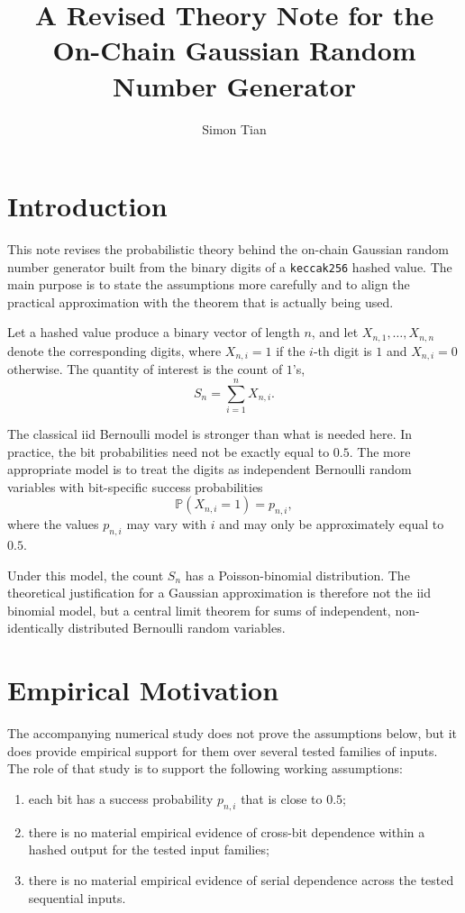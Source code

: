 \documentclass[11pt]{article}
\title{A Revised Theory Note for the On-Chain Gaussian Random Number Generator}
\author{Simon Tian}
\date{}
\begin{document}
\maketitle

\section{Introduction}

This note revises the probabilistic theory behind the on-chain Gaussian random
number generator built from the binary digits of a \texttt{keccak256} hashed
value. The main purpose is to state the assumptions more carefully and to align
the practical approximation with the theorem that is actually being used.

Let a hashed value produce a binary vector of length $n$, and let
$X_{n,1}, \dots, X_{n,n}$ denote the corresponding digits, where
$X_{n,i} = 1$ if the $i$-th digit is $1$ and $X_{n,i} = 0$ otherwise. The
quantity of interest is the count of $1$'s,
\[
S_n = \sum_{i=1}^n X_{n,i}.
\]

The classical iid Bernoulli model is stronger than what is needed here. In
practice, the bit probabilities need not be exactly equal to $0.5$. The more
appropriate model is to treat the digits as independent Bernoulli random
variables with bit-specific success probabilities
\[
\mathbb{P}(X_{n,i} = 1) = p_{n,i},
\]
where the values $p_{n,i}$ may vary with $i$ and may only be approximately
equal to $0.5$.

Under this model, the count $S_n$ has a Poisson-binomial distribution. The
theoretical justification for a Gaussian approximation is therefore not the iid
binomial model, but a central limit theorem for sums of independent,
non-identically distributed Bernoulli random variables.

\section{Empirical Motivation}

The accompanying numerical study does not prove the assumptions below, but it
does provide empirical support for them over several tested families of inputs.
The role of that study is to support the following working assumptions:

\begin{enumerate}
\item each bit has a success probability $p_{n,i}$ that is close to $0.5$;
\item there is no material empirical evidence of cross-bit dependence within a
hashed output for the tested input families;
\item there is no material empirical evidence of serial dependence across the
tested sequential inputs.
\end{enumerate}
\end{document}
